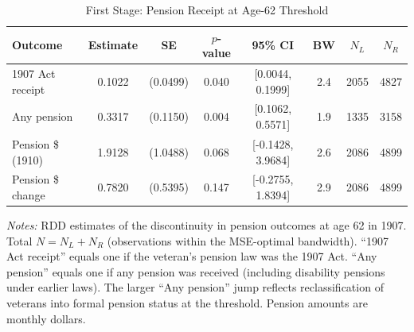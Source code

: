 \begin{table}[htbp]
\centering
\caption{First Stage: Pension Receipt at Age-62 Threshold}
\label{tab:first_stage}
\begin{tabular}{lccccccc}
\toprule
  Outcome & Estimate & SE & $p$-value & 95\% CI & BW & $N_L$ & $N_R$ \\
\midrule
  1907 Act receipt & 0.1022 & (0.0499) & 0.040 & [0.0044, 0.1999] & 2.4 & 2055 & 4827 \\
  Any pension & 0.3317 & (0.1150) & 0.004 & [0.1062, 0.5571] & 1.9 & 1335 & 3158 \\
  Pension \$ (1910) & 1.9128 & (1.0488) & 0.068 & [-0.1428, 3.9684] & 2.6 & 2086 & 4899 \\
  Pension \$ change & 0.7820 & (0.5395) & 0.147 & [-0.2755, 1.8394] & 2.9 & 2086 & 4899 \\
\bottomrule
\end{tabular}
\begin{tablenotes}[flushleft]
\small
\item \textit{Notes:} RDD estimates of the discontinuity in pension outcomes at age 62 in 1907. Total $N = N_L + N_R$ (observations within the MSE-optimal bandwidth). ``1907 Act receipt'' equals one if the veteran's pension law was the 1907 Act. ``Any pension'' equals one if any pension was received (including disability pensions under earlier laws). The larger ``Any pension'' jump reflects reclassification of veterans into formal pension status at the threshold. Pension amounts are monthly dollars.
\end{tablenotes}
\end{table}
